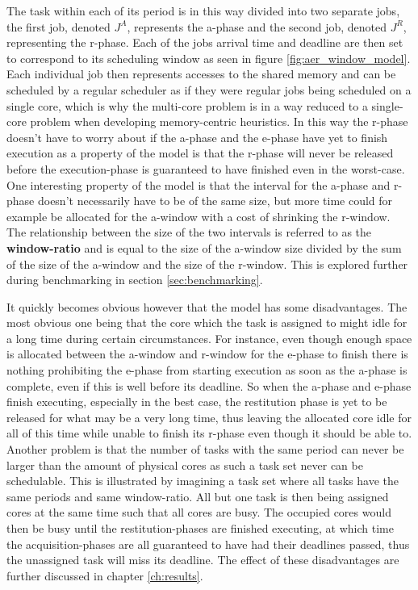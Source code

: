 \documentclass{kththesis}
\begin{document}
The task within each of its period is in this way divided into two separate jobs, the first job,
denoted $ J^{A} $, represents the \acrshort{a}-phase and the second job, denoted $ J^{R} $, representing
the \acrshort{r}-phase. Each of the jobs arrival time and deadline are then set to correspond to its
scheduling window as seen in figure \ref{fig:aer_window_model}. Each individual job then represents
accesses to the shared memory and can be scheduled by a regular scheduler as if they were regular
jobs being scheduled on a single core, which is why the multi-core problem is in a way reduced to a
single-core problem when developing memory-centric heuristics. In this way the \acrshort{r}-phase
doesn't have to worry about if the \acrshort{a}-phase and the \acrshort{e}-phase have yet to finish
execution as a property of the model is that the \acrshort{r}-phase will never be released before the
execution-phase is guaranteed to have finished even in the worst-case. One interesting property of the
model is that the interval for the \acrshort{a}-phase and \acrshort{r}-phase doesn't necessarily
have to be of the same size, but more time could for example be allocated for the
\acrshort{a}-window with a cost of shrinking the \acrshort{r}-window. The relationship between the
size of the two intervals is referred to as the \textbf{window-ratio} and is equal to the size of
the \acrshort{a}-window size divided by the sum of the size of the \acrshort{a}-window and
the size of the \acrshort{r}-window. This is explored further during benchmarking in section
\ref{sec:benchmarking}.

It quickly becomes obvious however that the model has some disadvantages. The most obvious one being
that the core which the task is assigned to might idle for a long time during certain circumstances.
For instance, even though enough space is allocated between the \acrshort{a}-window and
\acrshort{r}-window for the \acrshort{e}-phase to finish there is nothing prohibiting the
\acrshort{e}-phase from starting execution as soon as the \acrshort{a}-phase is complete, even if
this is well before its deadline. So when the \acrshort{a}-phase and \acrshort{e}-phase finish
executing, especially in the best case, the restitution phase is yet to be released for what may be
a very long time, thus leaving the allocated core idle for all of this time while unable to finish
its \acrshort{r}-phase even though it should be able to. Another problem is that the number of tasks
with the same period can never be larger than the amount of physical cores as such a task set never
can be schedulable. This is illustrated by imagining a task set where all tasks have the same
periods and same window-ratio. All but one task is then being assigned cores at the same time such
that all cores are busy. The occupied cores would then be busy until the restitution-phases are
finished executing, at which time the acquisition-phases are all guaranteed to have had their
deadlines passed, thus the unassigned task will miss its deadline. The effect of these disadvantages
are further discussed in chapter \ref{ch:results}.
\end{document}
